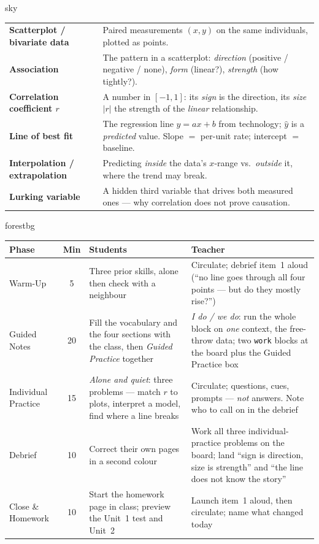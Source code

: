 \documentclass[10pt]{article}
\newcommand{\MeetingLength}{60 minutes}
\begin{document}
\begin{skillbox}{sky}
\renewcommand{\arraystretch}{1.3}
\begin{tabularx}{\linewidth}{@{}l X@{}}
\textbf{Scatterplot / bivariate data} & Paired measurements $(x,y)$ on the same individuals, plotted as points. \\
\textbf{Association} & The pattern in a scatterplot: \emph{direction} (positive / negative / none), \emph{form} (linear?), \emph{strength} (how tightly?). \\
\textbf{Correlation coefficient $r$} & A number in $[-1,1]$: its \emph{sign} is the direction, its \emph{size} $|r|$ the strength of the \emph{linear} relationship. \\
\textbf{Line of best fit} & The regression line $\hat y=ax+b$ from technology; $\hat y$ is a \emph{predicted} value. Slope $=$ per-unit rate; intercept $=$ baseline. \\
\textbf{Interpolation / extrapolation} & Predicting \emph{inside} the data's $x$-range vs.\ \emph{outside} it, where the trend may break. \\
\textbf{Lurking variable} & A hidden third variable that drives both measured ones --- why correlation does not prove causation. \\
\end{tabularx}
\end{skillbox}

\begin{fixedskillbox}[Lesson at a Glance --- \MeetingLength]{forestbg}
\renewcommand{\arraystretch}{1.25}
\begin{tabularx}{\linewidth}{@{}l c X X@{}}
\textbf{Phase} & \textbf{Min} & \textbf{Students} & \textbf{Teacher} \\
\hline
Warm-Up & 5 & Three prior skills, alone then check with a neighbour & Circulate; debrief item~1 aloud (``no line goes through all four points --- but do they mostly rise?'') \\
Guided Notes & 20 & Fill the vocabulary and the four sections with the class, then \emph{Guided Practice} together & \emph{I do / we do}: run the whole block on \emph{one} context, the free-throw data; two \texttt{work} blocks at the board plus the Guided Practice box \\
Individual Practice & 15 & \emph{Alone and quiet}: three problems --- match $r$ to plots, interpret a model, find where a line breaks & Circulate; questions, cues, prompts --- \emph{not} answers. Note who to call on in the debrief \\
Debrief & 10 & Correct their own pages in a second colour & Work all three individual-practice problems on the board; land ``sign is direction, size is strength'' and ``the line does not know the story'' \\
Close \& Homework & 10 & Start the homework page in class; preview the Unit~1 test and Unit~2 & Launch item~1 aloud, then circulate; name what changed today \\
\end{tabularx}
\end{fixedskillbox}
\end{document}
